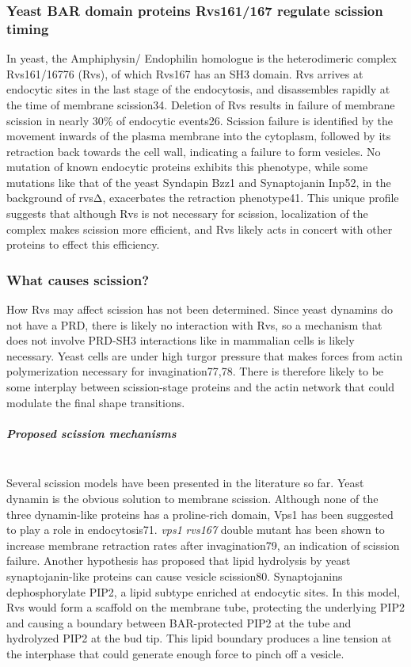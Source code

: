		\subsubsection{Yeast BAR domain proteins Rvs161/167 regulate scission timing}
		In yeast, the Amphiphysin/ Endophilin homologue is the heterodimeric complex Rvs161/16776 (Rvs), of which Rvs167 has an SH3 domain. Rvs arrives at endocytic sites in the last stage of the endocytosis, and disassembles rapidly at the time of membrane scission34. Deletion of Rvs results in failure of membrane scission in nearly 30\% of endocytic events26. Scission failure is identified by the movement inwards of the plasma membrane into the cytoplasm, followed by its retraction back towards the cell wall, indicating a failure to form vesicles. No mutation of known endocytic proteins exhibits this phenotype, while some mutations like that of the yeast Syndapin Bzz1 and Synaptojanin Inp52, in the background of rvsΔ, exacerbates the retraction phenotype41. This unique profile suggests that although Rvs is not necessary for scission, localization of the complex makes scission more efficient, and Rvs likely acts in concert with other proteins to effect this efficiency. 

		\subsubsection{What causes scission?}
		How Rvs may affect scission has not been determined. Since yeast dynamins do not have a PRD, there is likely no interaction with Rvs, so a mechanism that does not involve PRD-SH3 interactions like in mammalian cells is likely necessary. Yeast cells are under high turgor pressure that makes forces from actin polymerization necessary for invagination77,78. There is therefore likely to be some interplay between scission-stage proteins and the actin network that could modulate the final shape transitions. 

		
			\subparagraph{Proposed scission mechanisms}
			\mbox{}\\
			Several scission models have been presented in the literature so far. Yeast dynamin is the obvious solution to membrane scission. Although none of the three dynamin-like proteins has a proline-rich domain, Vps1 has been suggested to play a role in endocytosis71. \textit{vps1\textDelta} \textit{rvs167\textDelta}  double mutant has been shown to increase membrane retraction rates after invagination79, an indication of scission failure. Another hypothesis has proposed that lipid hydrolysis by yeast synaptojanin-like proteins can cause vesicle scission80. Synaptojanins dephosphorylate PIP2, a lipid subtype enriched at endocytic sites. In this model, Rvs would form a scaffold on the membrane tube, protecting the underlying PIP2 and causing a boundary between BAR-protected PIP2 at the tube and hydrolyzed PIP2 at the bud tip. This lipid boundary produces a line tension at the interphase that could generate enough force to pinch off a vesicle. 
			
